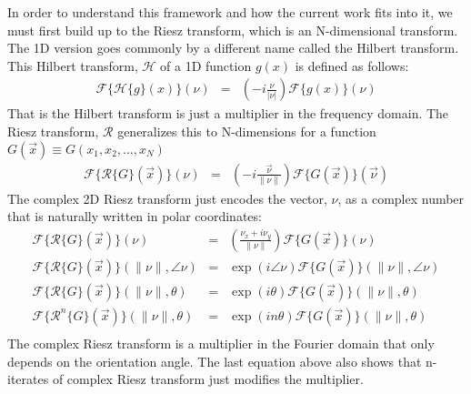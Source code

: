 \documentclass{article}
\begin{document}
In order to understand this framework and how the current work fits into it, we must first build up to the Riesz transform, which is an N-dimensional transform. The 1D version goes commonly by a different name called the Hilbert transform. This Hilbert transform, $ \mathcal{H} $ of a 1D function $ g(x) $ is defined as follows:
\begin{eqnarray}
    \mathcal{F}\{ \mathcal{H}\{g\}(x) \}(\nu) & = & (-i \frac{\nu}{\left| \nu \right|}) \mathcal{F}\{g(x)\}(\nu)
\end{eqnarray}
That is the Hilbert transform is just a multiplier in the frequency domain. The Riesz transform, $ \mathcal{R} $  generalizes this to N-dimensions for a function $ G(\vec{x}) \equiv G(x_1,x_2, \hdots, x_N) $
\begin{eqnarray}
    \mathcal{F}\{ \mathcal{R}\{G\}(\vec{x}) \}(\nu) & = & (-i \frac{\vec{\nu}}{\left\| \nu \right\|}) \mathcal{F}\{G(\vec{x})\}(\vec{\nu})
\end{eqnarray}
The complex 2D Riesz transform just encodes the vector, $ \nu $,  as a complex number that is naturally written in polar coordinates:
\begin{eqnarray}
    \mathcal{F}\{ \mathcal{R}\{G\}(\vec{x}) \}(\nu) & = & (\frac{\nu_x +i \nu_y}{\left\| \nu \right\|}) \mathcal{F}\{G(\vec{x})\}(\nu) \\
    \mathcal{F}\{ \mathcal{R}\{G\}(\vec{x}) \}(\|\nu\|,\angle \nu) & = & \exp(i \angle \nu) \mathcal{F}\{G(\vec{x})\}(\|\nu\|,\angle \nu) \\
    \mathcal{F}\{ \mathcal{R}\{G\}(\vec{x}) \}(\|\nu\|,\theta) & = & \exp(i \theta) \mathcal{F}\{G(\vec{x})\}(\|\nu\|,\theta) \\
    \mathcal{F}\{ \mathcal{R}^n\{G\}(\vec{x}) \}(\|\nu\|,\theta) & = & \exp(i n\theta) \mathcal{F}\{G(\vec{x})\}(\|\nu\|,\theta) \\
\end{eqnarray}
The complex Riesz transform is a multiplier in the Fourier domain that only depends on the orientation angle. The last equation above also shows that n-iterates of complex Riesz transform just modifies the multiplier.
\end{document}
